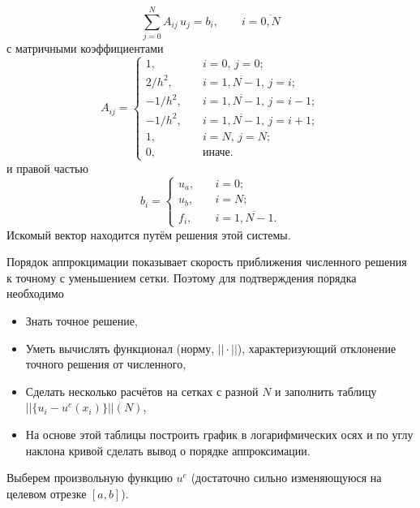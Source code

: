 \begin{equation*}
    \sum_{j=0}^{N} A_{ij}\,u_j = b_i, \qquad i=\overline{0,N}
\end{equation*}
с матричными коэффициентами
\begin{equation}
    \label{eq:poisson1d_fdm_lhs}
    A_{ij} = \begin{cases}
        1,      &\quad i=0, \, j=0; \\
        2/h^2,  &\quad i=\overline{1,N-1}, \, j=i;\\
        -1/h^2, &\quad i=\overline{1,N-1}, \, j=i-1;\\
        -1/h^2, &\quad i=\overline{1,N-1}, \, j=i+1;\\
        1,      &\quad i=N, \, j=N; \\
        0,      &\quad \text{иначе}.
    \end{cases}
\end{equation}
и правой частью
\begin{equation}
    \label{eq:poisson1d_fdm_rhs}
    b_i = \begin{cases}
        u_a,   &\quad i=0;\\
        u_b,   &\quad i=N;\\
        f_i,   &\quad i=\overline{1,N-1}.
    \end{cases}
\end{equation}
Искомый вектор находится путём решения этой системы.

\label{sec:compute-appr}

Порядок аппрокцимации показывает скорость
приближения численного решения к точному с уменьшением сетки.
Поэтому для подтверждения порядка необходимо
\begin{itemize}
\item Знать точное решение,
\item Уметь вычислять функционал (норму, $||\cdot||$), характеризующий отклонение точного решения от численного,
\item Сделать несколько расчётов на сетках с разной $N$  и заполнить таблицу $||\{u_i - u^e(x_i)\}||(N)$,
\item На основе этой таблицы построить график в логарифмических осях и по углу наклона кривой сделать вывод о порядке аппроксимации.
\end{itemize}

Выберем произвольную функцию $u^e$ (достаточно сильно изменяющуюся на целевом отрезке $[a,b]$).

